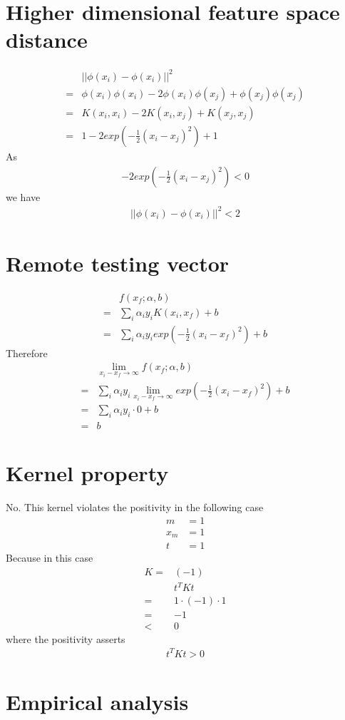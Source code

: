 \documentclass[12pt]{article}
\begin{document}
\section{Higher dimensional feature space distance}
\begin{align}
  & ||\phi(x_i)-\phi(x_i)||^2 \\
  =& \phi(x_i) \phi(x_i) - 2\phi(x_i) \phi(x_j) + \phi(x_j) \phi(x_j) \\
  =& K(x_i, x_i) -2 K(x_i, x_j) + K(x_j, x_j) \\
  =& 1 -2 exp(-\frac{1}{2} (x_i - x_j)^2) + 1
\end{align}
As
\begin{align}
  -2 exp(-\frac{1}{2} (x_i - x_j)^2) < 0
\end{align}
we have
\begin{align}
  ||\phi(x_i)-\phi(x_i)||^2 < 2
\end{align}
\section{Remote testing vector}
\begin{align}
  & f(x_f; \alpha,b) \\
  =& \sum_{i} \alpha_i y_i K(x_i, x_f) + b \\
  =& \sum_{i} \alpha_i y_i exp(-\frac{1}{2} (x_i - x_f)^2) + b
\end{align}
Therefore
\begin{align}
  & \lim_{x_i-x_f \to \infty} f(x_f; \alpha,b) \\
  =& \sum_{i} \alpha_i y_i \lim_{x_i-x_f \to \infty} exp(-\frac{1}{2} (x_i - x_f)^2) + b \\
  =& \sum_{i} \alpha_i y_i \cdot 0 + b \\
  =& b
\end{align}
\section{Kernel property}
No. This kernel violates the positivity in the following case
\begin{align}
  m &= 1 \\
  x_m &= 1 \\
  t &= 1
\end{align}
Because in this case
\begin{align}
  K =& (-1) \\
  & t^T K t \\
  =& 1 \cdot (-1) \cdot 1 \\
  =& -1 \\
  <& 0
\end{align}
where the positivity asserts
\begin{align}
   t^T K t > 0
\end{align}
\section{Empirical analysis}
\end{document}

